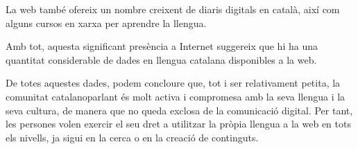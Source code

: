\begin{multicols}{2}
La web també ofereix un nombre creixent de diaris digitals en català, així com alguns cursos en xarxa per aprendre la llengua.

Amb tot, aquesta significant presència a Internet suggereix que hi ha una quantitat considerable de dades en llengua catalana disponibles a la web.  

De totes aquestes dades, podem concloure que, tot i ser relativament petita, la comunitat catalanoparlant és molt activa i compromesa amb la seva llengua i la seva cultura, de manera que no queda exclosa de la comunicació digital. Per tant, les persones volen exercir el seu dret a utilitzar la pròpia llengua a la web en tots els nivells, ja sigui en la cerca o en la creació de continguts. 

\end{multicols}

\clearpage




